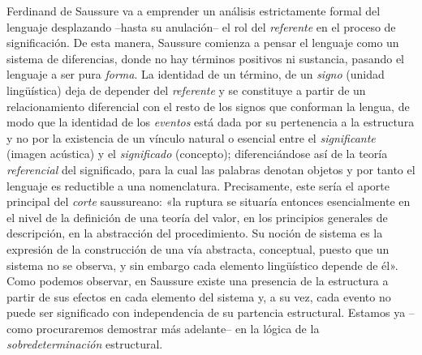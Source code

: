 Ferdinand de Saussure va a emprender un análisis estrictamente formal del lenguaje desplazando --hasta su anulación-- el rol del \emph{referente} en el proceso de significación. De esta manera, Saussure comienza a pensar el lenguaje como un sistema de diferencias, donde no hay términos positivos ni sustancia, pasando el lenguaje a ser pura \emph{forma}. La identidad de un término, de un \emph{signo }(unidad lingüística) deja de depender del\emph{ referente} y se constituye a partir de un relacionamiento diferencial con el resto de los signos que conforman la lengua, de modo que la identidad de los \emph{eventos }está dada por su pertenencia a la estructura y no por la existencia de un vínculo natural o esencial entre el \emph{significante }(imagen acústica) y el \emph{significado} (concepto); diferenciándose así de la teoría \emph{referencial }del significado, para la cual las palabras denotan objetos y por tanto el lenguaje es reductible a una nomenclatura. Precisamente, este sería el aporte principal del \emph{corte} saussureano: «la ruptura se situaría entonces esencialmente en el nivel de la definición de una teoría del valor, en los principios generales de descripción, en la abstracción del procedimiento. Su noción de sistema es la expresión de la construcción de una vía abstracta, conceptual, puesto que un sistema no se observa, y sin embargo cada elemento lingüístico depende de él». Como podemos observar, en Saussure existe una presencia de la estructura a partir de sus efectos en cada elemento del sistema y, a su vez, cada evento no puede ser significado con independencia de su partencia estructural. Estamos ya --como procuraremos demostrar más adelante-- en la lógica de la \emph{sobredeterminación} estructural.

